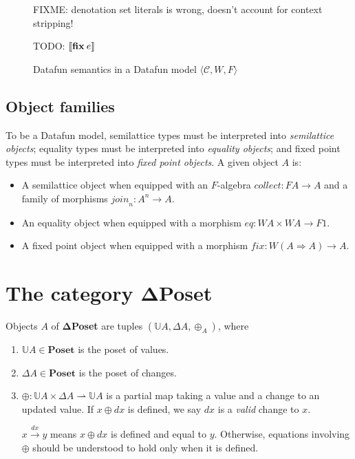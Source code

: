 \documentclass{rntz}\usepackage[a5]{rntzgeometry}\usepackage[fullwidth=130mm,width=330pt,]{narrow}
\newcommand\mathvar[1]{\ensuremath{#1}} %
\newcommand\todo[1]{{\color{ACMRed}#1}}
\newcommand\cat\textbf
\newcommand\CP{\cat{\texorpdfstring{$\boldsymbol\Delta$Poset}{DeltaPoset}}}
\newcommand\Poset{\cat{Poset}}
\newcommand\termO{1}
\newcommand\D\Delta
\newcommand\x\times
\newcommand\pto\rightharpoonup
\newcommand\tuple[1]{\langle{#1}\rangle}
\newcommand\<{\mskip 4mu plus 4mu minus 1mu}
\newcommand\dx{\mathvar{dx}}
\newcommand\valfn{\ensuremath{\mathbb{U}}}
\newcommand\vals{\valfn}
\newcommand\chgs[1]{\D{#1}}
\newcommand\upd{\mathbin{\oplus}}
\newcommand\updfn{\ensuremath{{\upd}}}
\newcommand\kwname\textbf
\newcommand\efix{\kwname{fix}\<}
\newcommand\den[1]{\ensuremath{\left\llbracket{#1}\right\rrbracket}}
\newcommand\homto\Rightarrow
\newcommand\catC{\ensuremath{\mathcal{C}}}
\newcommand\down{\ensuremath{F}}
\newcommand\disco{\ensuremath{W}}
\newcommand\downof[1]{\down #1}
\newcommand\discof[1]{\ensuremath{\disco #1}}
\newcommand\morph\mathit
\newcommand\validarrow\to
\newcommand\valid[1]{\mathrel{\overset{#1}{\validarrow}}}
\newcommand\vld[3]{{#2 \valid{#1} #3}}
\begin{document}
\begin{figure*}[p]
  \todo{FIXME: denotation set literals is wrong, doesn't account for context stripping!}

  \todo{TODO: $\den{\efix e}$}

  \caption{Datafun semantics in a Datafun model $\tuple{\catC, \disco, \down}$}
  \label{fig:general-semantics}
\end{figure*}


\subsection{Object families}
\label{sec:object-families}

To be a Datafun model, semilattice types must be interpreted into
\emph{semilattice objects}; equality types must be interpreted into
\emph{equality objects}; and fixed point types must be interpreted into
\emph{fixed point objects}. A given object $A$ is:


\begin{itemize}
\item A semilattice object when equipped with an \down-algebra $\morph{collect} :
  \downof{A} \to A$ and a family of morphisms $\morph{join}_n : A^n \to A$.

\item An equality object when equipped with a morphism $\morph{eq} : \discof A \x
\discof A \to \downof \termO$.

\item A fixed point object when equipped with a morphism $\morph{fix} : \discof{(A
  \homto A)} \to A$.
\end{itemize}


\section{The category \CP}
\label{sec:changeposets}

Objects $A$ of \CP{} are tuples $(\vals A, \chgs A, \updfn_A)$, where
%
\begin{enumerate}
\item $\vals A \in \Poset$ is the poset of values.

\item $\chgs A \in \Poset$ is the poset of changes.

\item $\updfn : \vals A \x \chgs A \pto \vals A$ is a partial map taking a value
  and a change to an updated value. If $x \upd \dx$ is defined, we say $\dx$ is a
  \emph{valid} change to $x$.

  $\vld{\dx} x y$ means $x \upd \dx$ is defined and equal to $y$. Otherwise,
  equations inv\-olv\-ing \updfn{} should be understood to hold only when it is
  defined.
\end{enumerate}
\end{document}
